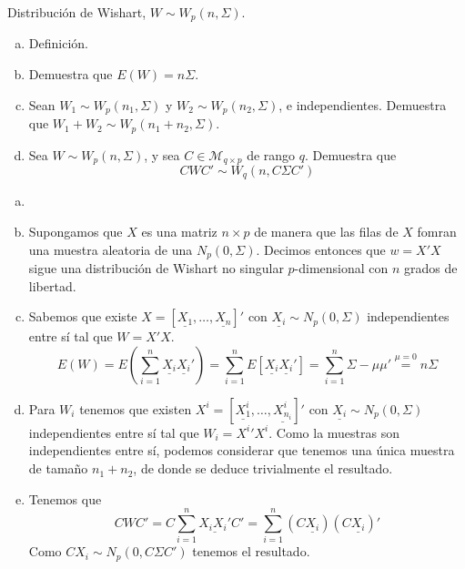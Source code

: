 \documentclass[twoside]{article}
\newcommand{\muestra}[1]{{\underline{#1}}}
\begin{document}
\begin{ejercicio}{1.3}
Distribución de Wishart, $W \sim W_p(n,Σ)$.
\begin{enumerate}[(a)]
\item Definición.
\item Demuestra que $E(W) = nΣ$.
\item Sean $W_1 \sim W_p(n_1,Σ)$ y $W_2 \sim W_p(n_2,Σ)$, e independientes. Demuestra que $W_1 + W_2 \sim W_p(n_1+n_2,Σ)$.
\item Sea $W \sim W_p(n,Σ)$, y sea $C \in \mathcal{M}_{q\times p}$ de rango $q$. Demuestra que
\[ C W C' \sim W_q(n, CΣC') \]
\end{enumerate}
\end{ejercicio}
\begin{solucion}
\begin{enumerate}[(a)]
\item[]
\item Supongamos que $X$ es una matriz $n\times p$ de manera que las filas de $X$ fomran una muestra aleatoria de una $N_p(0,\Sigma)$. Decimos entonces que $w=X'X$ sigue una distribución de Wishart no singular $p$-dimensional con $n$ grados de libertad.
\item Sabemos que existe $X=[\muestra{X_1},\dotsc,\muestra{X_n}]'$ con $\muestra{X_i}\sim N_p(0,\Sigma)$ independientes entre sí tal que $W=X'X$.
$$
E(W)= E\left(\sum_{i=1}^n \muestra{X_i}\muestra{X_i}'\right) = \sum_{i=1}^n E[\muestra{X_i}\muestra{X_i}'] = \sum_{i=1}^n \Sigma-\mu\mu' \overset{\mu=0}{=} n\Sigma
$$
\item Para $W_i$ tenemos que existen $ X^i=[\muestra{X_1^i},\dotsc,\muestra{X_{n_i}^i}]'$  con $\muestra{X_i}\sim N_p(0,\Sigma)$ independientes entre sí tal que $W_i={X^i}' X^i$. Como la muestras son independientes entre sí, podemos considerar que tenemos una única muestra de tamaño $n_1+n_2$, de donde se deduce trivialmente el resultado.
\item Tenemos que 
$$
CWC' = C\sum_{i=1}^n \muestra{X_i X_i'}C' = \sum_{i=1}^n (C\muestra{X_i}) (C\muestra{X_i})'
$$
Como $CX_i \sim N_p(0,C\Sigma C')$ tenemos el resultado.
\end{enumerate}
\end{solucion}
\newpage
\end{document}
